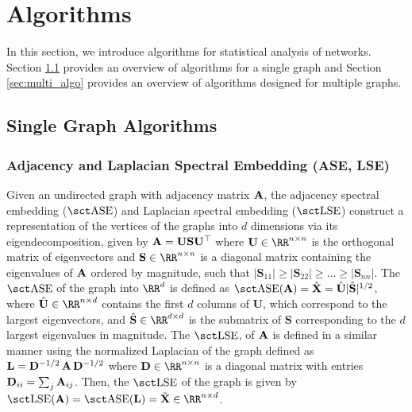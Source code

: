 \section{Algorithms}\label{sec:algorithms}
In this section, we introduce algorithms for statistical analysis of networks. Section \ref{sec:single_algo} provides an overview of algorithms for a single graph and Section \ref{sec:multi_algo} provides an overview of algorithms designed for multiple graphs. 



\subsection{Single Graph Algorithms}\label{sec:single_algo}
\subsubsection{Adjacency and Laplacian Spectral Embedding (ASE, LSE)} \label{sec:ase}
Given an undirected graph with adjacency matrix $\operatorname{\mathbf{A}}$, the adjacency spectral embedding ($\ase$) and Laplacian spectral embedding ($\lse$) construct a representation of the vertices of the graphs into $d$ dimensions via its eigendecomposition, given by
$\operatorname{\mathbf{A}} = \mathbf{U}\mathbf{S}\mathbf{U}^\top$
where $\mathbf{U}\in\RR^{n\times n}$ is the orthogonal matrix of eigenvectors and $\mathbf{S}\in\RR^{n\times n}$ is a diagonal matrix containing the eigenvalues of $\operatorname{\mathbf{A}}$ ordered by magnitude, such that $|\mathbf{S}_{11}|\geq |\mathbf{S}_{22}| \geq \ldots \geq |\mathbf{S}_{nn}|$. 
 The $\ase$ of the graph into $\RR^{d}$ is defined as $\ase(\A)=\hat{\X}= \hat{\mathbf{U}}|\hat{\mathbf{S}}|^{1/2}$, where $\hat{\mathbf{U}}\in\RR^{n\times d}$ contains the first $d$ columns of $\mathbf{U}$, which correspond to the largest eigenvectors, and $\hat{\mathbf{S}}\in\RR^{d\times d}$ is the submatrix of $\mathbf{S}$ corresponding to the $d$ largest eigenvalues in magnitude. The $\lse$, of $\operatorname{\mathbf{A}}$ is defined in a similar manner using the normalized Laplacian of the graph defined as $\mathbf{L} = \mathbf{D}^{-1/2}\operatorname{\mathbf{A}}\mathbf{D}^{-1/2}$ where $\mathbf{D} \in\RR^{n\times n}$ is a diagonal matrix with entries $\mathbf{D}_{ii}=\sum_j\operatorname{\mathbf{A}}_{ij}$. Then, the $\lse$ of the graph is given by $\lse(\A)=\ase(\mathbf{L})=\tilde \X\in\RR^{n\times d}$.

